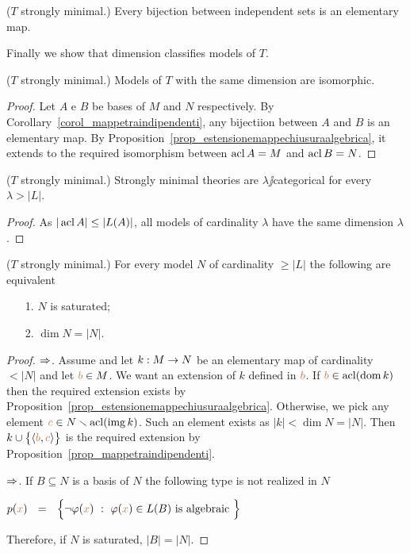 \begin{corollary}\label{corol_mappetraindipendenti} 
($T$ strongly minimal.) Every bijection between independent sets is an elementary map.\QED
\end{corollary}

Finally we show that dimension classifies models of $T$.

\begin{theorem}
($T$ strongly minimal.) Models of $T$ with the same dimension are isomorphic.
\end{theorem}
\begin{proof}
Let $A$ e $B$ be bases of $M$ and $N$ respectively.
By Corollary~\ref{corol_mappetraindipendenti}, any bijectiion between $A$ and $B$ is an elementary map.
By Proposition~\ref{prop_estensionemappechiusuraalgebrica}, it extends to the required isomorphism between $\mathop{\rm acl} A=M$ and $\mathop{\rm acl} B=N$.
\end{proof}

\begin{corollary} 
($T$ strongly minimal.) Strongly minimal theories are $\lambda\jj$categorical for every $\lambda>|L|$.
\end{corollary}
\begin{proof}
As $|\mathop{\rm acl} A|\le |L(A)|$, all models of cardinality $\lambda$ have the same dimension $\lambda$.
\end{proof}

\begin{proposition} 
($T$ strongly minimal.) For every model $N$ of cardinality $\ge|L|$ the following are equivalent
\begin{itemize}
\item[1.] $N$ is saturated;
\item[2.] $\dim N=|N|$.
\end{itemize}
\end{proposition}

\begin{proof}
$\Rightarrow$.
Assume  and let $k:M\rightarrow N$ be an elementary map of cardinality $<|N|$ and let ${\color{brown} b}\in M$.
We want an extension of $k$ defined in ${\color{brown} b}$.
If ${\color{brown} b}\in\mathop{\rm acl}(\mathop{\rm dom} k)$ then the required extension exists by Proposition~\ref{prop_estensionemappechiusuraalgebrica}.
Otherwise, we pick any element ${\color{brown} c}\in N\smallsetminus\mathop{\rm acl}(\mathop{\rm img} k)$.
Such an element exists as $|k|<\dim N=|N|$.
Then $k\cup\big\{\langle{\color{brown}b},{\color{brown} c}\rangle\big\}$ is the required extension by Proposition~\ref{prop_mappetraindipendenti}.

$\Rightarrow$.
If $B\subseteq N$ is a basis of $N$ the following type is not realized in $N$

\hfil $p({\color{brown} x})\ \ =\ \ \Big\{\neg\varphi({\color{brown} x})\ :\ \varphi({\color{brown} x})\in L(B)\textrm{ is algebraic }\Big\}$

Therefore, if $N$ is saturated, $|B|=|N|$.
\end{proof}

